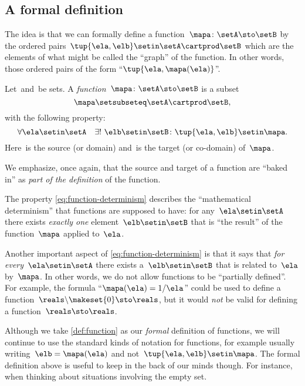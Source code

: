 \subsection{A formal definition}

The idea is that we can formally define a function~$\mapa\colon \setA \sto \setB$ by the ordered pairs~$\tup{\ela, \elb} \setin\setA \cartprod \setB$ which are the elements of what might be called the ``graph'' of the function.
In other words, those ordered pairs of the form ``$\tup{\ela, \mapa(\ela)}$''.

\begin{ctdefinition}[Function]
    \label{def:function}
    Let~\setA and~\setB be sets.
    A \emph{function}~$\mapa\colon \setA \sto \setB$ is a subset
    \begin{equation}
        \mapa \setsubseteq \setA \cartprod \setB,
    \end{equation}
    with the following property:
    \begin{equation}
        \label{eq:function-determinism}
        \forall \ela \setin\setA  \quad  \exists !
        \ \elb \setin\setB \colon \tup{\ela,\elb} \setin\mapa.
    \end{equation}
    Here~\setA is the source (or domain) and~\setB is the target (or co-domain) of~$\mapa$.
\end{ctdefinition}

We emphasize, once again, that the source and target of a function are ``baked in'' as \emph{part of the definition} of the function.

The property \cref{eq:function-determinism} describes the ``mathematical determinism'' that functions are supposed to have: for any~$\ela \setin\setA$ there exists \emph{exactly one} element~$\elb \setin\setB$ that is ``the result'' of the function~$\mapa$ applied to~$\ela$.

Another important aspect of \cref{eq:function-determinism} is that it says that \emph{for every}~$\ela \setin\setA$ there exists a~$\elb \setin\setB$ that is related to~$\ela$ by~$\mapa$.
In other words, we do not allow functions to be ``partially defined''.
For example, the formula ``$\mapa(\ela) = 1/ \ela$'' could be used to define a function~$\reals \backslash \makeset{ 0 } \sto \reals$, but it would \emph{not} be valid for defining a function~$\reals \sto \reals$.

Although we take \cref{def:function} as our \emph{formal} definition of functions, we will continue to use the standard kinds of notation for functions, for example usually writing~$\elb = \mapa(\ela)$ and not~$\tup{\ela, \elb} \setin\mapa$.
The formal definition above is useful to keep in the back of our minds though.
For instance, when thinking about situations involving the empty set.

